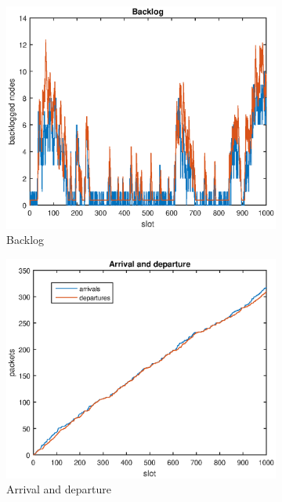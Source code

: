 \documentclass{article}
\begin{document}
\begin{figure}[h]
  \begin{subfigure}{.5\textwidth}
    \includegraphics[width=\textwidth]{figures/backlog-stabilized.eps}
    \caption{Backlog}
    \label{fig:backlog-stabilized}
  \end{subfigure}%
  \begin{subfigure}{.5\textwidth}
    \includegraphics[width=\textwidth]{figures/arrival-departure-stabilized.eps}
    \caption{Arrival and departure}
    \label{fig:arrival-departure-stabilized}
  \end{subfigure}
  \caption{}
\end{figure}
\end{document}
